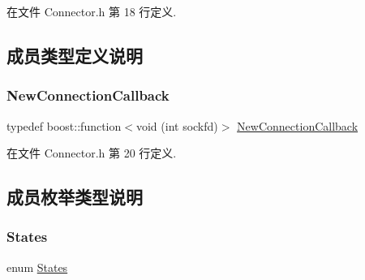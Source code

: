 在文件 Connector.\+h 第 18 行定义.



\subsection{成员类型定义说明}
\mbox{\label{classmuduo_1_1Connector_a74d0c9e28e41cb2b3310e0c1d3671710}} 
\subsubsection{\texorpdfstring{New\+Connection\+Callback}{NewConnectionCallback}}
{\footnotesize\ttfamily typedef boost\+::function$<$void (int sockfd)$>$ \hyperlink{classmuduo_1_1Connector_a74d0c9e28e41cb2b3310e0c1d3671710}{New\+Connection\+Callback}}



在文件 Connector.\+h 第 20 行定义.



\subsection{成员枚举类型说明}
\mbox{\label{classmuduo_1_1Connector_a808e5cd4979462d3bbe3070d7d147444}} 
\subsubsection{\texorpdfstring{States}{States}}
{\footnotesize\ttfamily enum \hyperlink{classmuduo_1_1Connector_a808e5cd4979462d3bbe3070d7d147444}{States}\hspace{0.3cm}{\ttfamily [private]}}

